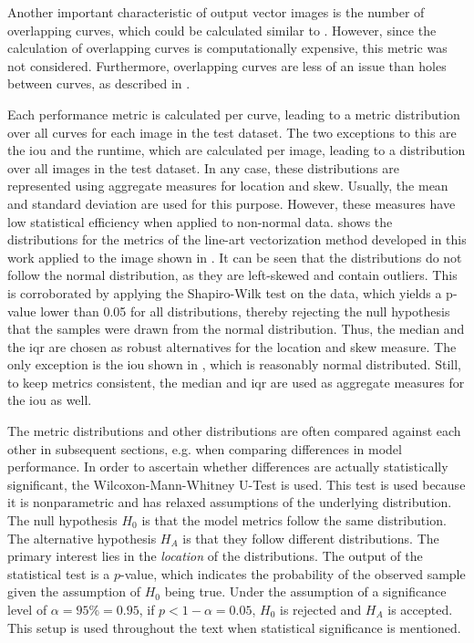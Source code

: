 Another important characteristic of output vector images is the number of overlapping curves, which could be calculated  similar to . However, since the calculation of overlapping curves is computationally expensive, this metric was not considered. Furthermore, overlapping curves are less of an issue than holes between curves, as described in .

Each performance metric is calculated per curve, leading to a metric distribution over all curves for each image in the test dataset. The two exceptions to this are the \gls{iou} and the runtime, which are calculated per image, leading to a distribution over all images in the test dataset. In any case, these distributions are represented using aggregate measures for location and skew. Usually, the mean and standard deviation are used for this purpose. However, these measures have low statistical efficiency when applied to non-normal data.  shows the distributions for the metrics of the line-art vectorization method developed in this work applied to the image shown in . It can be seen that the distributions do not follow the normal distribution, as they are left-skewed and contain outliers. This is corroborated by applying the Shapiro-Wilk test \citep{10.1093/biomet/52.3-4.591} on the data, which yields a p-value lower than 0.05 for all distributions, thereby rejecting the null hypothesis that the samples were drawn from the normal distribution. Thus, the median and the \gls{iqr} are chosen as robust alternatives for the location and skew measure. The only exception is the \gls{iou} shown in , which is reasonably normal distributed. Still, to keep metrics consistent, the median and \gls{iqr} are used as aggregate measures for the \gls{iou} as well.

The metric distributions and other distributions are often compared against each other in subsequent sections, e.g. when comparing differences in model performance. In order to ascertain whether differences are actually statistically significant, the Wilcoxon-Mann-Whitney U-Test \citep{c4091bd3-d888-3152-8886-c284bf66a93a,10.1214/aoms/1177730491} is used. This test is used because it is nonparametric and has relaxed assumptions of the underlying distribution. The null hypothesis $H_0$ is that the model metrics follow the same distribution. The alternative hypothesis $H_A$ is that they follow different distributions. The primary interest lies in the \textit{location} of the distributions. The output of the statistical test is a $p$-value, which indicates the probability of the observed sample given the assumption of $H_0$ being true. Under the assumption of a significance level of $\alpha=95\%=0.95$, if $p < 1-\alpha=0.05$, $H_0$ is rejected and $H_A$ is accepted. This setup is used throughout the text when statistical significance is mentioned.

